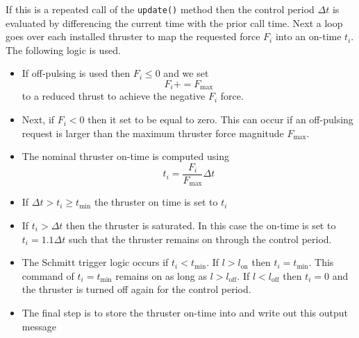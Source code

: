 If this is a repeated call of the {\tt update()} method then the control period $\Delta t$ is evaluated by differencing the current time with the prior call time.  Next a loop goes over each installed thruster to map the requested force $F_{i}$ into an on-time $t_{i}$.  The following logic is used.
\begin{itemize}
	\item If off-pulsing is used then $F_{i}\le 0$ and we set $$F_{i} += F_{\text{max}}$$ to a reduced thrust to achieve the negative $F_{i}$ force.
	\item Next, if $F_{i} < 0$ then it set to be equal to zero.  This can occur if an off-pulsing request is larger than the maximum thruster force magnitude $F_{\text{max}}$.
	\item The nominal thruster on-time is computed using $$t_{i}  = \dfrac{F_{i}}{F_{\text{max}}} \Delta t$$
	\item If $\Delta t > t_{i} \ge t_{\text{min}}$ the thruster on time is set to $t_{i}$
	\item If $t_{i} > \Delta t$ then the thruster is saturated.   In this case the on-time is set to $t_{i} = 1.1\Delta t$ such that the thruster remains on through the control period.
	\item The Schmitt trigger logic occurs if $t_{i} < t_{\text{min}}$.  If $l>l_{\text{on}}$ then $t_{i} = t_{\text{min}}$.  This command of $t_{i} = t_{\text{min}}$ remains on as long as $l > l_{\text{off}}$.  If $l<l_{\text{off}}$ then $t_{i} = 0$ and the thruster is turned off again for the control period.
	\item The final step is to store the thruster on-time into  and write out this output message
\end{itemize}
